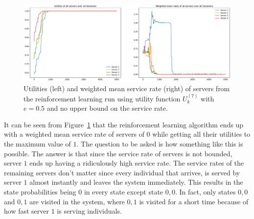 \begin{figure}[H]
    \includegraphics[width=\textwidth]{chapters/06_agent_based_extension/Bin/reinforcement_learning_results/utility_7/u7_5_no_max_e05.pdf}
    \caption{Utilities (left) and weighted mean service rate (right) of servers
    from the reinforcement learning run using utility function \(U_k^{(7)}\)
    with \(e = 0.5\) and no upper bound on the service rate.}
    \label{fig:RL_utility7_5_no_max_e05}
\end{figure}

It can be seen from Figure~\ref{fig:RL_utility7_5_no_max_e05} that the
reinforcement learning algorithm ends up with a weighted mean service rate of
servers of \(0\) while getting all their utilities to the maximum value of
\(1\).
The question to be asked is how something like this is possible.
The answer is that since the service rate of servers is not bounded, server
\(1\) ends up having a ridiculously high service rate.
The service rates of the remaining servers don't matter since every individual
that arrives, is served by server \(1\) almost instantly and leaves the system
immediately.
This results in the state probabilities being \(0\) in every state except state
\(0,0\).
In fact, only states \(0,0\) and \(0,1\) are visited in the system, where
\(0,1\) is visited for a short time because of how fast server \(1\) is
serving individuals.



